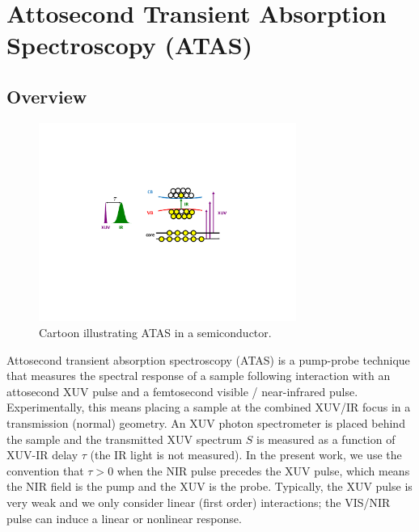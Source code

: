 \section{Attosecond Transient Absorption Spectroscopy (ATAS)}
\label{sec:ATAS}

\subsection{Overview}

\begin{figure}
	\centering
	\includegraphics[width=0.75\textwidth]{figures/chap1/ATAS_cartoon.pdf}
	\caption{Cartoon illustrating ATAS in a semiconductor.}
	\label{fig:ATAS_cartoon}
\end{figure}


Attosecond transient absorption spectroscopy (ATAS) is a pump-probe technique that measures the spectral response of a sample following interaction with an attosecond XUV pulse and a femtosecond visible / near-infrared pulse. Experimentally, this means placing a sample at the combined XUV/IR focus in a transmission (normal) geometry. An XUV photon spectrometer is placed behind the sample and the transmitted XUV spectrum $S$ is measured as a function of XUV-IR delay $\tau$ (the IR light is not measured). In the present work, we use the convention that $\tau>0$ when the NIR pulse precedes the XUV pulse, which means the NIR field is the pump and the XUV is the probe. Typically, the XUV pulse is very weak and we only consider linear (first order) interactions; the VIS/NIR pulse can induce a linear or nonlinear response.

